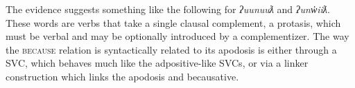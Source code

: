 \begin{comment}
\ex~ \label{ex:because2}
\begingl
\glpreamble ʔuunuuƛḥs hiniiʔiƛ ʔin m̓iƛaa. //
\gla ʔuunuuƛ-(q)ḥ=s mačiił ʔin m̓iƛ-aˑ //
\glb because-\textsc{link}=\textsc{strg.1sg} inside.\textsc{mo} \textsc{comp} rain-\textsc{dr} //
\glft `I came inside because it was raining.' (\textbf{N}, Fidelia Haiyupis) //
\endgl
\xe

\ex \label{ex:unwiitllink2}
\begingl
\glpreamble hitaʔapintniš ʔunw̓iiƛḥ ʕuuy̓aałintin. //
\gla hitaʔap=int=niš ʔunw̓iiƛ-(q)ḥ ʕuuy̓aał=int=(y)in //
\glb inside.\textsc{mo}=\textsc{real.1sg} because-\textsc{link} take.medicine=\textsc{pst}=\textsc{weak.1pl} //
\glft `We won because we had medicine.' (\textbf{N}, Fidelia Haiyupis) //
\endgl
\xe

\ex~ \label{ex:unwiitllink3}
\begingl
\glpreamble *hitaʔapintniš ʔunw̓iiƛ ʕuuy̓aałintin. //
\gla hitaʔap=int=niš ʔunw̓iiƛ ʕuuy̓aał=int=(y)in //
\glb inside.\textsc{mo}=\textsc{real.1sg} because take.medicine=\textsc{pst}=\textsc{weak.1pl} //
\glft Intended: `We won because we had medicine.' (\textbf{N}, Fidelia Haiyupis) //
\endgl
\xe

\ex~ \label{ex:uunuutllink1}
\begingl
\glpreamble wikits ƛuł waʔič ʔunʔuuƛḥ wawaałwiqa ʕiniiƛ. //
\gla wik=(m)it=s ƛuł waʔič ʔunʔuuƛ-(q)ḥ wawaałwiqa ʕiniiƛ //
\glb \textsc{neg}=\textsc{pst}=\textsc{real.1sg} good sleep because-\textsc{link} bark dog //
\glft `I didn't sleep well because the dog was barking.' (\textbf{C}, Julia Lucas) //
\endgl
\xe

\ex~ \label{ex:uunuutllink2}
\begingl
\glpreamble *wikits ƛuł waʔič ʔunʔuuƛ wawaałwiqa ʕiniiƛ. //
\gla wik=(m)it=s ƛuł waʔič ʔunʔuuƛ wawaałwiqa ʕiniiƛ //
\glb \textsc{neg}=\textsc{pst}=\textsc{real.1sg} good sleep bark dog //
\glft Intended: `I didn't sleep well because the dog was barking.' (\textbf{C}, Julia Lucas) //
\endgl
\xe
\end{comment}

The evidence suggests something like the following for \textit{ʔuunuuƛ} and \textit{ʔunw̓iiƛ}. These words are verbs that take a single clausal complement, a protasis, which must be verbal and may be optionally introduced by a complementizer. The way the \textsc{because} relation is syntactically related to its apodosis is either through a SVC, which behaves much like the adpositive-like SVCs, or via a linker construction which links the apodosis and becausative.

